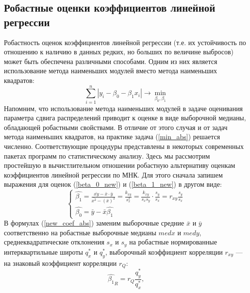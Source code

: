 \documentclass{article}
\begin{document}
	
	


    \subsection{Робастные оценки коэффициентов линейной регрессии}
    \noindent Робастность оценок коэффициентов линейной регрессии (т.е. их устойчивость по отношению к наличию в данных редких, но больших по величине выбросов) может быть обеспечена различными способами. Одним из них является использование метода наименьших модулей вместо метода наименьших квадратов:
    \begin{equation}
	    \sum_{i=1}^{n}{|y_{i} - \beta_{0} - \beta_{1}x_{i}|}\rightarrow \min_{\beta_{0}, \beta_{1}}
	    \label{min_abs}
	\end{equation}
    Напомним, что использование метода наименьших модулей в задаче оценивания параметра сдвига распределений приводит к оценке в виде выборочной медианы, обладающей робастными свойствами. В отличие от этого случая и от задач метода наименьших квадратов, на практике задача (\ref{min_abs}) решается численно. Соответствующие процедуры представлены в некоторых современных пакетах программ по статистическому анализу.
    \newline
    Здесь мы рассмотрим простейшую в вычистлительном отношении робастную альтернативу оценкам коэффициентов линейной регрессии по МНК. Для этого сначала запишем выражения для оценок (\ref{beta_0_new}) и (\ref{beta_1_new}) в другом виде:
    \begin{equation}
    	\begin{cases}
        \hat{\beta_{1}} = \frac{\bar{xy} - \bar{x} \cdot \bar{y}}{\bar{x^{2}} - (\bar{x})^{2}} = \frac{k_{xy}}{s_{x}^{2}} = \frac{k_{xy}}{s_{x}s_{y}} \cdot \frac{s_{y}}{s_{x}} = r_{xy}\frac{s_{y}}{s_{x}} \\         
        \hat{\beta_{0}} = \bar{y} - \bar{x}\hat{\beta_{1}}
        \end{cases}
        \label{new_coef_abs}
    \end{equation}
    В формулах (\ref{new_coef_abs}) заменим выборочные средние $\bar{x}$ и $\bar{y}$ соответственно на робастные выборочные медианы $med x$ и $med y$, среднеквадратические отклонения $s_{x}$ и $s_{y}$ на робастные нормированные интерквартильные широты $q^{*}_{x}$ и $q^{*}_{y}$, выборочный коэффициент корреляции $r_{xy}$ — на знаковый коэффициент корреляции $r_{Q}$: 
    \begin{equation}
        \hat{\beta_{1}}_{R} = r_{Q}\frac{q^{*}_{y}}{q^{*}_{x}},
        \label{b_1R}
    \end{equation}
\end{document}
